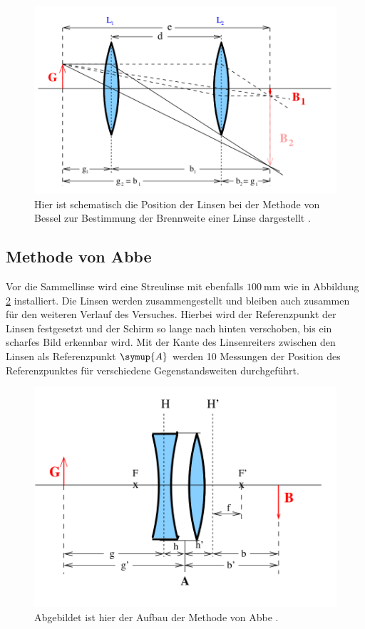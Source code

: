 \begin{figure}[H]
    \includegraphics{Bilder/Bessel.png}
    \centering
    \caption{Hier ist schematisch die Position der Linsen bei der Methode von Bessel zur Bestimmung der Brennweite einer Linse dargestellt \cite{V408}.}
    \label{fig:Bessel}
\end{figure}


\subsection{Methode von Abbe}
Vor die Sammellinse wird eine Streulinse mit ebenfalls $\qty{100}{\milli\meter}$ wie in Abbildung \ref{fig:Abbe} installiert.
Die Linsen werden zusammengestellt und bleiben auch zusammen für den weiteren Verlauf des Versuches.
Hierbei wird der Referenzpunkt der Linsen festgesetzt und der Schirm so lange nach hinten verschoben, bis ein scharfes Bild erkennbar wird.
Mit der Kante des Linsenreiters zwischen den Linsen als Referenzpunkt $\symup{A}$ werden 10 Messungen der Position des Referenzpunktes für verschiedene Gegenstandsweiten durchgeführt.


\begin{figure}[H]
    \includegraphics{Bilder/Abbe.png}
    \centering
    \caption{Abgebildet ist hier der Aufbau der Methode von Abbe \cite{V408}.}
    \label{fig:Abbe}
\end{figure}
